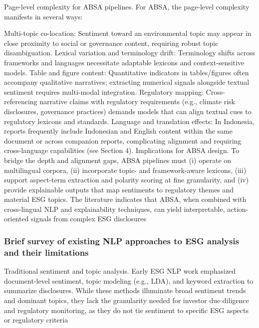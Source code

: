 Page-level complexity for ABSA pipelines. For ABSA, the page-level complexity manifests in several ways:

Multi-topic co-location: Sentiment toward an environmental topic may appear in close proximity to social or governance content, requiring robust topic disambiguation.
Lexical variation and terminology drift: Terminology shifts across frameworks and languages necessitate adaptable lexicons and context-sensitive models.
Table and figure content: Quantitative indicators in tables/figures often accompany qualitative narratives; extracting numerical signals alongside textual sentiment requires multi-modal integration.
Regulatory mapping: Cross-referencing narrative claims with regulatory requirements (e.g., climate risk disclosures, governance practices) demands models that can align textual cues to regulatory lexicons and standards.
Language and translation effects: In Indonesia, reports frequently include Indonesian and English content within the same document or across companion reports, complicating alignment and requiring cross-language capabilities (see Section 4).
Implications for ABSA design. To bridge the depth and alignment gaps, ABSA pipelines must (i) operate on multilingual corpora, (ii) incorporate topic- and framework-aware lexicons, (iii) support aspect-term extraction and polarity scoring at fine granularity, and (iv) provide explainable outputs that map sentiments to regulatory themes and material ESG topics. The literature indicates that ABSA, when combined with cross-lingual NLP and explainability techniques, can yield interpretable, action-oriented signals from complex ESG disclosures \cite{10.3390/math12193119,10.1002/csr.70089,10.1111/eufm.12509,10.1109/access.2023.3348342,10.2139/ssrn.3738629}

\subsubsection{Brief survey of existing NLP approaches to ESG analysis and their limitations}
Traditional sentiment and topic analysis. Early ESG NLP work emphasized document-level sentiment, topic modeling (e.g., LDA), and keyword extraction to summarize disclosures. While these methods illuminate broad sentiment trends and dominant topics, they lack the granularity needed for investor due diligence and regulatory monitoring, as they do not tie sentiment to specific ESG aspects or regulatory criteria \cite{10.3390/su15054134,10.69593/ajbais.v4i04.130,10.1111/eufm.12509}

